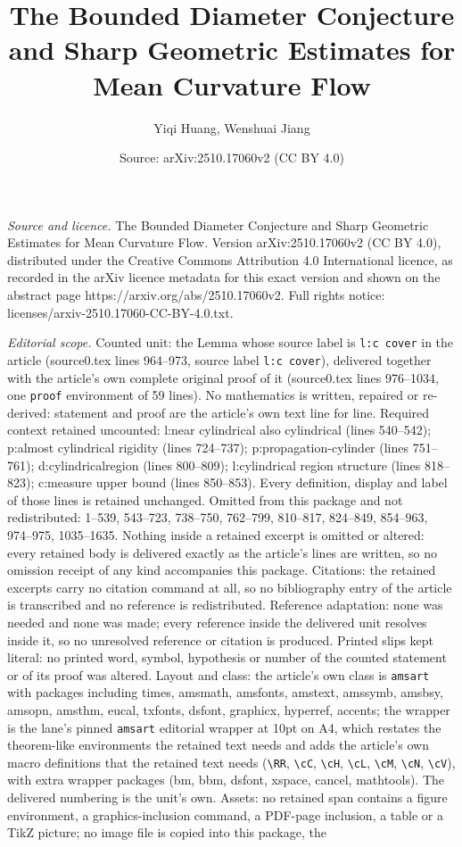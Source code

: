 \documentclass[10pt,a4paper]{amsart}
\title[The Bounded Diameter Conjecture and Sharp Geometric Estimate]{The Bounded Diameter Conjecture and Sharp Geometric Estimates for Mean Curvature Flow}
\author{Yiqi Huang, Wenshuai Jiang}
\date{Source: arXiv:2510.17060v2 (CC BY 4.0)}
\begin{document}
\maketitle

\noindent\emph{Source and licence.} The Bounded Diameter Conjecture and Sharp Geometric Estimates for Mean Curvature Flow. Version arXiv:2510.17060v2 (CC BY 4.0), distributed under the Creative Commons Attribution 4.0 International licence, as recorded in the arXiv licence metadata for this exact version and shown on the abstract page https://arxiv.org/abs/2510.17060v2. Full rights notice: licenses/arxiv-2510.17060-CC-BY-4.0.txt.\par\smallskip

\noindent\textit{Editorial scope.} Counted unit: the Lemma whose source label is \texttt{l:c cover} in the article (source0.tex lines 964--973, source label \texttt{l:c cover}), delivered together with the article's own complete original proof of it (source0.tex lines 976--1034, one \texttt{proof} environment of 59 lines). No mathematics is written, repaired or re-derived: statement and proof are the article's own text line for line. Required context retained uncounted: l:near cylindrical also cylindrical (lines 540--542); p:almost cylindrical rigidity (lines 724--737); p:propagation-cylinder (lines 751--761); d:cylindricalregion (lines 800--809); l:cylindrical region structure (lines 818--823); c:measure upper bound (lines 850--853). Every definition, display and label of those lines is retained unchanged. Omitted from this package and not redistributed: 1--539, 543--723, 738--750, 762--799, 810--817, 824--849, 854--963, 974--975, 1035--1635. Nothing inside a retained excerpt is omitted or altered: every retained body is delivered exactly as the article's lines are written, so no omission receipt of any kind accompanies this package. Citations: the retained excerpts carry no citation command at all, so no bibliography entry of the article is transcribed and no reference is redistributed. Reference adaptation: none was needed and none was made; every reference inside the delivered unit resolves inside it, so no unresolved reference or citation is produced. Printed slips kept literal: no printed word, symbol, hypothesis or number of the counted statement or of its proof was altered. Layout and class: the article's own class is \texttt{amsart} with packages including times, amsmath, amsfonts, amstext, amssymb, amsbsy, amsopn, amsthm, eucal, txfonts, dsfont, graphicx, hyperref, accents; the wrapper is the lane's pinned \texttt{amsart} editorial wrapper at 10pt on A4, which restates the theorem-like environments the retained text needs and adds the article's own macro definitions that the retained text needs (\texttt{\textbackslash RR}, \texttt{\textbackslash cC}, \texttt{\textbackslash cH}, \texttt{\textbackslash cL}, \texttt{\textbackslash cM}, \texttt{\textbackslash cN}, \texttt{\textbackslash cV}), with extra wrapper packages (bm, bbm, dsfont, xspace, cancel, mathtools). The delivered numbering is the unit's own. Assets: no retained span contains a figure environment, a graphics-inclusion command, a PDF-page inclusion, a table or a TikZ picture; no image file is copied into this package, the 
\end{document}
